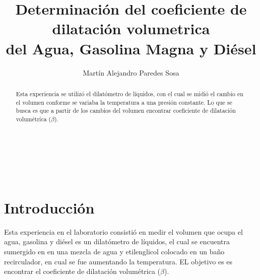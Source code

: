 \documentclass[12pt]{article}
\title{Determinación del coeficiente de dilatación volumetrica \\ del Agua, Gasolina Magna y Diésel}
\author{Martín Alejandro Paredes Sosa}
\makeatletter
\let\thetitle\@title
\let\theauthor\@author
\makeatother
\begin{document}
\begin{center}
{ \large \bfseries \thetitle}\\
\end{center}
	\begin{minipage}{\textwidth}
		\begin{center} 
			\theauthor 
			\end{center}
	\end{minipage}\\[-0.52 cm]
\begin{abstract}
	Esta experiencia se utilizó el dilatómetro de líquidos, con el cual se midió el cambio en el volumen  conforme se variaba la temperatura a una presión constante. Lo que se busca es que a partir de los cambios del volumen encontrar coeficiente de dilatación volumétrica ($\beta$).

\end{abstract}
\vspace{-1cm}
\section{Introducción}
Esta experiencia en el laboratorio consistió en medir el volumen que ocupa el agua, gasolina y diésel es un dilatómetro de líquidos, el cual se encuentra sumergido en  en una mezcla de agua y etilenglicol colocado en un baño recirculador, en cual se fue aumentando la temperatura. EL objetivo es es encontrar el coeficiente de dilatación volumétrica ($\beta$).
\end{document}
